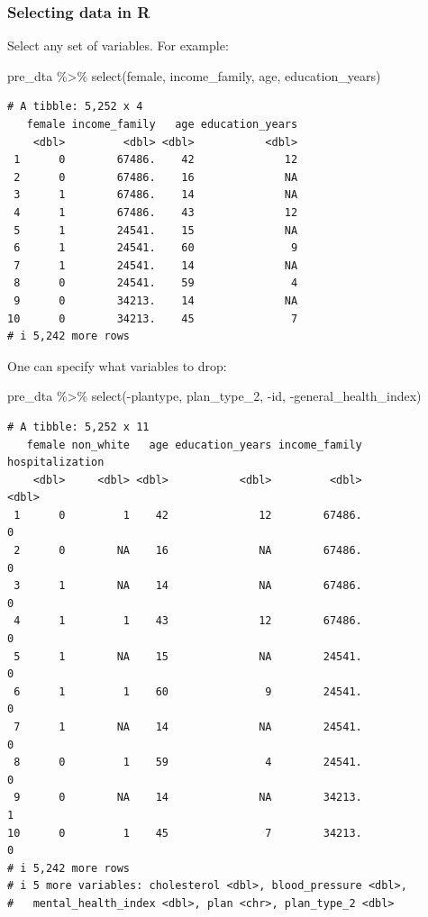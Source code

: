\documentclass[
  letterpaper,
  DIV=11,
  numbers=noendperiod]{scrartcl}
\newenvironment{Shaded}{\begin{snugshade}}{\end{snugshade}}
\newcommand{\FunctionTok}[1]{\textcolor[rgb]{0.28,0.35,0.67}{#1}}
\newcommand{\NormalTok}[1]{\textcolor[rgb]{0.00,0.23,0.31}{#1}}
\newcommand{\SpecialCharTok}[1]{\textcolor[rgb]{0.37,0.37,0.37}{#1}}
\begin{document}
\hypertarget{selecting-data-in-r}{%
\subsubsection{Selecting data in R}\label{selecting-data-in-r}}

Select any set of variables. For example:

\begin{Shaded}
\begin{Highlighting}[]
\NormalTok{pre\_dta }\SpecialCharTok{\%\textgreater{}\%} \FunctionTok{select}\NormalTok{(female, income\_family, age, education\_years)}
\end{Highlighting}
\end{Shaded}

\begin{verbatim}
# A tibble: 5,252 x 4
   female income_family   age education_years
    <dbl>         <dbl> <dbl>           <dbl>
 1      0        67486.    42              12
 2      0        67486.    16              NA
 3      1        67486.    14              NA
 4      1        67486.    43              12
 5      1        24541.    15              NA
 6      1        24541.    60               9
 7      1        24541.    14              NA
 8      0        24541.    59               4
 9      0        34213.    14              NA
10      0        34213.    45               7
# i 5,242 more rows
\end{verbatim}

One can specify what variables to drop:

\begin{Shaded}
\begin{Highlighting}[]
\NormalTok{pre\_dta }\SpecialCharTok{\%\textgreater{}\%} \FunctionTok{select}\NormalTok{(}\SpecialCharTok{{-}}\NormalTok{plantype, plan\_type\_2, }\SpecialCharTok{{-}}\NormalTok{id, }\SpecialCharTok{{-}}\NormalTok{general\_health\_index)}
\end{Highlighting}
\end{Shaded}

\begin{verbatim}
# A tibble: 5,252 x 11
   female non_white   age education_years income_family hospitalization
    <dbl>     <dbl> <dbl>           <dbl>         <dbl>           <dbl>
 1      0         1    42              12        67486.               0
 2      0        NA    16              NA        67486.               0
 3      1        NA    14              NA        67486.               0
 4      1         1    43              12        67486.               0
 5      1        NA    15              NA        24541.               0
 6      1         1    60               9        24541.               0
 7      1        NA    14              NA        24541.               0
 8      0         1    59               4        24541.               0
 9      0        NA    14              NA        34213.               1
10      0         1    45               7        34213.               0
# i 5,242 more rows
# i 5 more variables: cholesterol <dbl>, blood_pressure <dbl>,
#   mental_health_index <dbl>, plan <chr>, plan_type_2 <dbl>
\end{verbatim}
\end{document}
